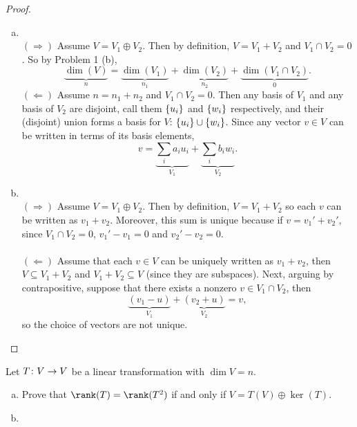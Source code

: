 \documentclass{article}
\begin{document}
\begin{proof} ~
  \begin{enumerate}[(a)]
    \item ~\\ $(\Longrightarrow)$ Assume $V = V_1 \oplus V_2$. Then by definition,
    $V = V_1 + V_2$ and $V_1 \cap V_2 = 0$. So by Problem 1 (b), \[
      \underbrace{\dim(V)}_{n} =
      \underbrace{\dim(V_1)}_{n_1} +
      \underbrace{\dim(V_2)}_{n_2} +
      \underbrace{\dim(V_1 \cap V_2)}_{0}.
    \]
    $(\Longleftarrow)$ Assume $n = n_1 + n_2$ and $V_1 \cap V_2 = 0$.
    Then any basis of $V_1$ and any basis of $V_2$ are disjoint, call them
    $\left\{ u_i \right\}$ and $\left\{ w_i \right\}$ respectively, and their (disjoint) union forms
    a basis for $V$: $\left\{ u_i \right\} \cup \left\{ w_i \right\}$. Since any vector $v \in V$ can
    be written in terms of its basis elements, \[
      v = \underbrace{\sum_i a_iu_i}_{V_1} + \underbrace{\sum_i b_iw_i}_{V_2}.
    \]
    \item ~\\
    $(\Longrightarrow)$ Assume $V = V_1 \oplus V_2$. Then by definition,
    $V = V_1 + V_2$ so each $v$ can be written as $v_1 + v_2$. Moreover, this
    sum is unique because if $v = v_1' + v_2'$, since $V_1 \cap V_2 = 0$,
    $v_1' - v_1 = 0$ and $v_2' - v_2 = 0$.
    \\~\\
    $(\Longleftarrow)$ Assume that each $v \in V$ can be uniquely written as
    $v_1 + v_2$, then $V \subseteq V_1 + V_2$ and $V_1 + V_2 \subseteq V$
    (since they are subspaces). Next, arguing by contrapositive, suppose that
    there exists a nonzero $v \in V_1 \cap V_2$, then \[
      \underbrace{(v_1 - u)}_{V_1} + \underbrace{(v_2 + u)}_{V_2} = v,
    \] so the choice of vectors are not unique.
  \end{enumerate}
\end{proof}
\begin{problem}{3} %
  Let $T \colon V \rightarrow V$ be a linear transformation with $\dim V = n$.
  \begin{enumerate}[(a)]
    \item Prove that $\rank(T) = \rank(T^2)$ if and only if $V = T(V) \oplus \ker(T)$.
    \item
  \end{enumerate}
\end{problem}
\end{document}
